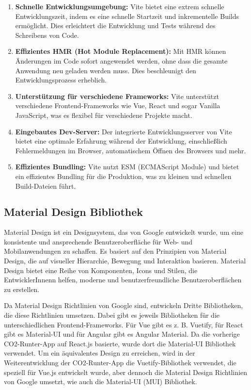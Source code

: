 \begin{enumerate}
    \item \textbf{Schnelle Entwicklungsumgebung:} Vite bietet eine extrem schnelle Entwicklungszeit, indem es eine schnelle Startzeit und inkrementelle Builds ermöglicht. Dies erleichtert die Entwicklung und Tests während des Schreibens von Code.

    \item \textbf{Effizientes HMR (Hot Module Replacement):} Mit HMR können Änderungen im Code sofort angewendet werden, ohne dass die gesamte Anwendung neu geladen werden muss. Dies beschleunigt den Entwicklungsprozess erheblich.

    \item \textbf{Unterstützung für verschiedene Frameworks:} Vite unterstützt verschiedene Frontend-Frameworks wie Vue, React und sogar Vanilla JavaScript, was es flexibel für verschiedene Projekte macht.

    \item \textbf{Eingebautes Dev-Server:} Der integrierte Entwicklungsserver von Vite bietet eine optimale Erfahrung während der Entwicklung, einschließlich Fehlermeldungen im Browser, automatischem Öffnen des Browsers und mehr.

    \item \textbf{Effizientes Bundling:} Vite nutzt ESM (ECMAScript Module) und bietet ein effizientes Bundling für die Produktion, was zu kleinen und schnellen Build-Dateien führt.
\end{enumerate}

\subsection{Material Design Bibliothek}

Material Design ist ein Designsystem, das von Google entwickelt wurde, um eine konsistente und ansprechende Benutzeroberfläche für Web- und Mobilanwendungen zu schaffen. Es basiert auf den Prinzipien von Material Design, die auf visueller Hierarchie, Bewegung und Interaktion basieren. Material Design bietet eine Reihe von Komponenten, Icons und Stilen, die EntwicklerInnenn helfen, moderne und benutzerfreundliche Benutzeroberflächen zu erstellen. \cite{materialdesign}

Da Material Design Richtlinien von Google sind, entwickeln Dritte Bibliotheken, die diese Richtlinien umsetzen. Dabei gibt es jeweils Bibliotheken für die unterschiedlichen Frontend-Frameworks. Für Vue gibt es z. B. Vuetify, für React gibt es Material-UI und für Angular gibt es Angular Material. Da die vorherige CO2-Runter-App auf React.js basierte, wurde dort die Material-UI Bibliothek verwendet. Um ein äquivalentes Design zu erreichen, wird in der Weiterentwicklung der CO2-Runter-App die Vuetify-Bibliothek verwendet, die speziell für Vue.js entwickelt wurde, aber dennoch die Material Design Richtlinien von Google umsetzt, wie auch die Material-UI (MUI) Bibliothek.

